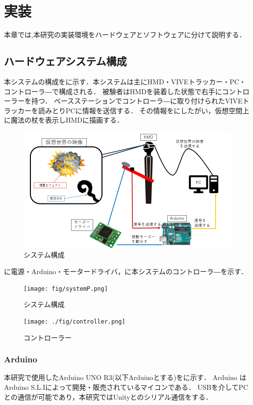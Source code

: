 \chapter{実装}
本章では,本研究の実装環境をハードウェアとソフトウェアに分けて説明する．

\section{ハードウェアシステム構成}
本システムの構成をに示す．本システムは主にHMD・VIVEトラッカー・PC・コントローラ―で構成される．
被験者はHMDを装着した状態で右手にコントローラーを持つ．
ベースステーションでコントローラ―に取り付けられたVIVEトラッカーを読みとりPCに情報を送信する．
その情報をにしたがい，仮想空間上に魔法の杖を表示しHMDに描画する．

\begin{figure}[h]
\centering
\includegraphics[clip,width=14cm]{fig/systemhard.png}
\caption{システム構成}\label{sys}
\end{figure}

\newpage

に電源・Arduino・モータードライバ，に本システムのコントローラ―を示す．

\begin{figure}[h]
    \centering
    \texttt{[image: fig/systemP.png]}
    \caption{システム構成}\label{sysP}
    \end{figure}

\begin{figure}[h]
\centering
\texttt{[image: ./fig/controller.png]}
\caption{コントローラー}\label{controller}
\end{figure}

\newpage

\subsection{Arduino}
本研究で使用したArduino UNO R3\cite{arduino}(以下Arduinoとする)をに示す．
Arduino はArduino S.L.Iによって開発・販売されているマイコンである．
USBを介してPCとの通信が可能であり，本研究ではUnityとのシリアル通信をする．

